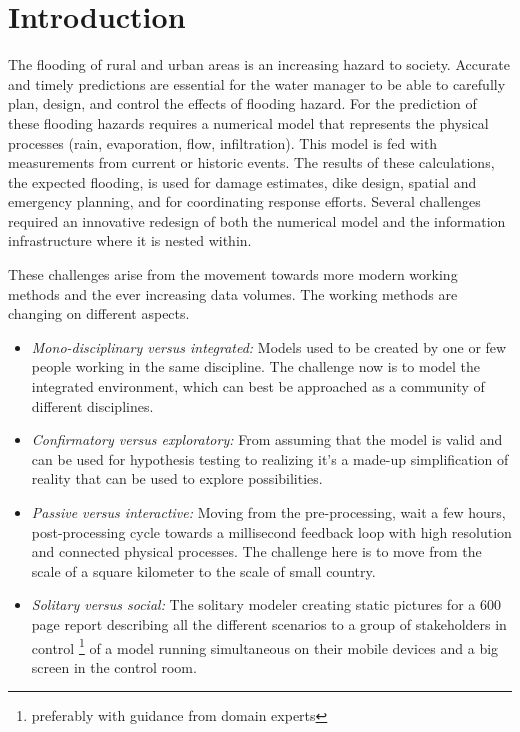 \documentclass[a4paper]{article}
\begin{document}
\section{Introduction}
The flooding of rural and urban areas is an increasing hazard to society. Accurate and timely predictions are essential for the water manager to be able to carefully plan, design, and control the effects of flooding hazard.
For the prediction of these flooding hazards requires a numerical model that represents the physical processes (rain, evaporation, flow, infiltration). This model is fed with measurements from current or historic events. The results of these calculations, the expected flooding, is used for damage estimates, dike design, spatial and emergency planning, and for coordinating response efforts. Several challenges required an innovative redesign of both the numerical model and the information infrastructure where it is nested within.

These challenges arise from the movement towards more modern working methods and the ever increasing data volumes. The working methods are changing on different aspects.
\begin{itemize}
\item \emph{Mono-disciplinary versus integrated:} Models used to be created by one or few people working in the same discipline. The challenge now is to model the integrated environment, which can best be approached as a community \citep{Voinov2010} of different disciplines.
\item \emph{Confirmatory versus exploratory:} From assuming that the model is valid and can be used for hypothesis testing to realizing it's a made-up simplification of reality \citep{Oreskes1994} that can be used to explore possibilities.
\item \emph{Passive versus interactive:} Moving from the pre-processing, wait a few hours, post-processing cycle towards a millisecond feedback loop with high resolution and connected physical processes. The challenge here is to move from the scale of a square kilometer \citep[for example][]{Losasso2008} to the scale of small country.
\item \emph{Solitary versus social:} The solitary modeler creating static pictures for a 600 page report describing all the different scenarios to a group of stakeholders in control \footnote{preferably with guidance from domain experts} of a model running simultaneous on their mobile devices and a big screen in the control room.
\end{itemize}
\end{document}
